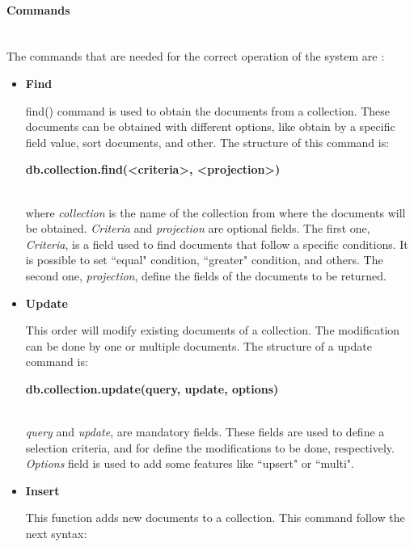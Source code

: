 \documentclass[12pt, a4paper,twoside]{tesi_upf}
\begin{document}
            \paragraph{Commands}\\
            The commands that are needed for the correct operation of the system are \cite{mongocmd}:
            \begin{itemize}
            \item \textbf{Find}
            
            find() command is used to obtain the documents from a collection. These documents can be obtained with different options, like obtain by a specific field value, sort documents, and other.
            The structure of this command is: \\
            
            \centerline{\textbf{db.collection.find(\textless criteria\textgreater, \textless projection\textgreater)}}\\
            
            where \textit{collection} is the name of the collection from where the documents will be obtained. \textit{Criteria} and \textit{projection} are optional fields. The first one, \textit{Criteria}, is a field used to find documents that follow a specific conditions. It is possible to set ``equal" condition, ``greater" condition, and others. The second one, \textit{projection}, define the fields of the documents to be returned.
            
            \item \textbf{Update}
            
            This order will modify existing documents of a collection. The modification can be done by one or multiple documents. The structure of a update command is: \\
            
            \centerline{\textbf{db.collection.update(query, update, options)}}\\
            \textit{query} and \textit{update}, are mandatory fields. These fields are used to define a selection criteria, and for define the modifications to be done, respectively. \textit{Options} field is used to add some features like ``upsert" or ``multi".
            
            \item \textbf{Insert}
            
            This function adds new documents to a collection. This command follow the next syntax: \\
                

\end{itemize}
\end{document}
